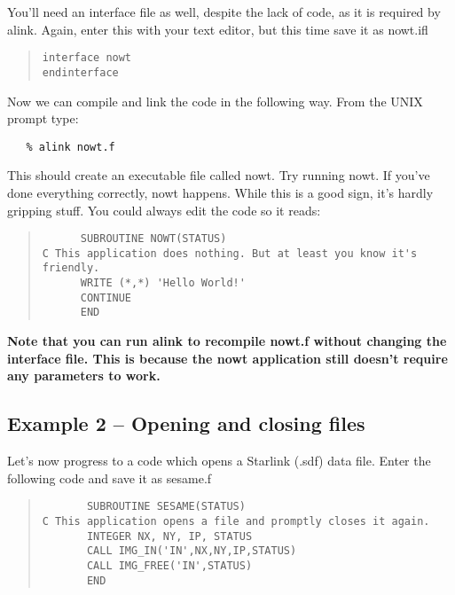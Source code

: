       You'll need an interface file as well,
      despite the lack of code, as it is required by {\sf alink}.
      Again, enter this with your text editor, but this time save it as {\sf
      nowt.ifl}

\begin{quote}
{\small
\begin{verbatim}
interface nowt
endinterface
\end{verbatim}
}
\end{quote}

      Now we can compile and link the code in the following way. From the
      UNIX prompt type:

\begin{verbatim}
   % alink nowt.f
\end{verbatim}

      This should create an executable file called {\sf nowt}. Try running
      {\sf nowt}. If you've done everything correctly, nowt happens. While
      this is a good sign, it's hardly gripping stuff. You could
      always edit the code so it reads:

\begin{quote}
{\small
\begin{verbatim}
      SUBROUTINE NOWT(STATUS)
C This application does nothing. But at least you know it's friendly.
      WRITE (*,*) 'Hello World!'
      CONTINUE
      END
\end{verbatim}
}
\end{quote}

      {\bf Note that you can run {\sf alink} to
      recompile {\sf nowt.f} without changing the interface file. This is
      because the {\sf nowt} application still doesn't require any
      parameters to work.}

\subsection{Example 2 -- Opening and closing files}

Let's now progress to a code which opens a Starlink (.sdf)
data file. Enter the following
code and save it as {\sf sesame.f}

\begin{quote}
{\small
\begin{verbatim}
       SUBROUTINE SESAME(STATUS)
C This application opens a file and promptly closes it again.
       INTEGER NX, NY, IP, STATUS
       CALL IMG_IN('IN',NX,NY,IP,STATUS)
       CALL IMG_FREE('IN',STATUS)
       END
\end{verbatim}
}
\end{quote}

